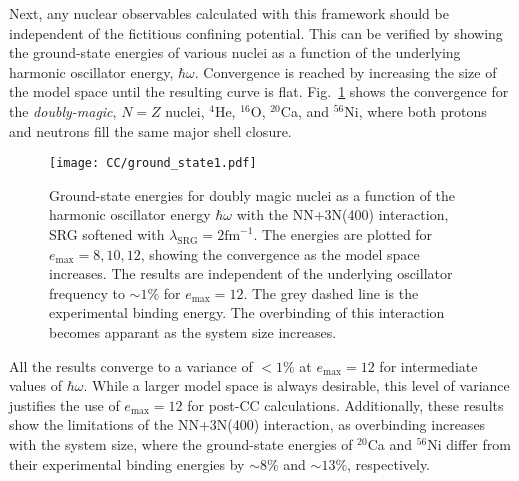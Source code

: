 \documentclass[thesis.tex]{subfiles}
\begin{document}
Next, any nuclear observables calculated with this framework should be independent of the fictitious confining potential.  This can be verified by showing the ground-state energies of various nuclei as a function of the underlying harmonic oscillator energy, $\hbar\omega$.  Convergence is reached by increasing the size of the model space until the resulting curve is flat.  Fig.\ \ref{fig:Ground_State1} shows the convergence for the \textit{doubly-magic}, $N=Z$ nuclei, ${}^{4}$He, ${}^{16}$O, ${}^{20}$Ca, and ${}^{56}$Ni, where both protons and neutrons fill the same major shell closure.
\begin{figure}[h!]
  \centering
  \texttt{[image: CC/ground\_state1.pdf]}
  \caption{Ground-state energies for doubly magic nuclei as a function of the harmonic oscillator energy $\hbar\omega$ with the NN+3N(400) interaction, SRG softened with $\lambda_{\mathrm{SRG}}=2\mathrm{fm}^{-1}$.  The energies are plotted for $e_\mathrm{max}=8,10,12$, showing the convergence as the model space increases.  The results are independent of the underlying oscillator frequency to $\sim 1\%$ for $e_\mathrm{max}=12$.  The grey dashed line is the experimental binding energy.  The overbinding of this interaction becomes apparant as the system size increases.}
  \label{fig:Ground_State1}
\end{figure}
All the results converge to a variance of $<1\%$ at $e_{\mathrm{max}}=12$ for intermediate values of $\hbar\omega$.  While a larger model space is always desirable, this level of variance justifies the use of $e_{\mathrm{max}}=12$ for post-CC calculations.  Additionally, these results show the limitations of the NN+3N(400) interaction, as overbinding increases with the system size, where the ground-state energies of ${}^{20}$Ca and ${}^{56}$Ni differ from their experimental binding energies by $\sim 8\%$ and $\sim 13\%$, respectively.
\end{document}
